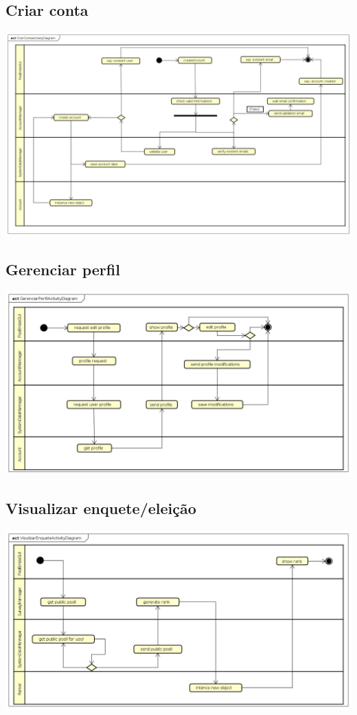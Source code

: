 \documentclass[a4paper,12pt]{report}
\begin{document}
\subsection*{Criar conta}
\markright{}
\includegraphics[width=14.3cm]{activity_diagrams/CriarContaActivityDiagram.png}

\subsection*{Gerenciar perfil}
\markright{}
\includegraphics[width=14.3cm]{activity_diagrams/GerenciarPerfilActivityDiagram.png}

\subsection*{Visualizar enquete/eleição}
\markright{}
\includegraphics[width=14.3cm]{activity_diagrams/VisulizarEnqueteActivityDiagram.png}
\end{document}
